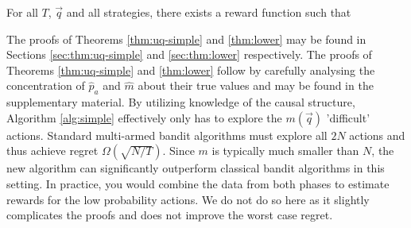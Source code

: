 \begin{theorem}\label{thm:lower}
For all $T$, $\vec{q}$ and all strategies, there exists a reward function such that
\end{theorem}

\ifsup
The proofs of Theorems \ref{thm:uq-simple} and \ref{thm:lower} may be found in Sections \ref{sec:thm:uq-simple} and \ref{sec:thm:lower} respectively.
\else
The proofs of Theorems \ref{thm:uq-simple} and \ref{thm:lower} follow by carefully analysing the concentration
of $\hat p_a$ and $\hat m$ about their true values and may be found in the supplementary material.
\fi
By utilizing knowledge of the causal structure, Algorithm \ref{alg:simple} effectively only has to explore the $m(\vec{q})$ 'difficult' actions. Standard multi-armed bandit algorithms must explore all $2N$ actions and thus achieve regret  $\Omega(\sqrt{N/T})$. Since $m$ is typically much smaller than $N$, the new algorithm can significantly outperform classical bandit algorithms in this setting. In practice, you would combine the data from both phases to estimate rewards for the low probability actions. We do not do so here as it slightly complicates the proofs and does not improve the worst case regret.

